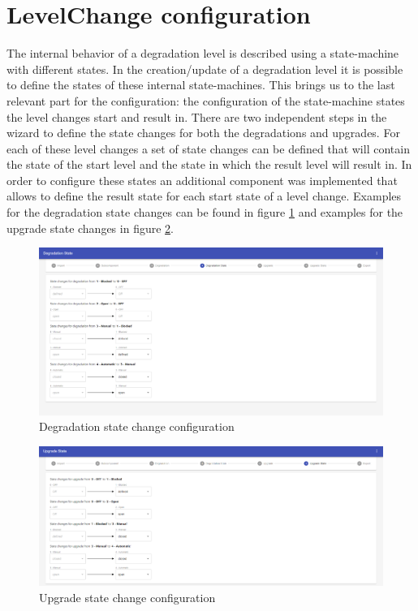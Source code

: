 \section{LevelChange configuration}
The internal behavior of a degradation level is described using a state-machine with different states. In the creation/update of a degradation level it is possible to define the states of these internal state-machines. This brings us to the last relevant part for the configuration: the configuration of the state-machine states the level changes start and result in. There are two independent steps in the wizard to define the state changes for both the degradations and upgrades. For each of these level changes a set of state changes can be defined that will contain the state of the start level and the state in which the result level will result in. In order to configure these states an additional component was implemented that allows to define the result state for each start state of a level change. Examples for the degradation state changes can be found in figure \ref{fig:deg_state_change} and examples for the upgrade state changes in figure \ref{fig:upg:state_change}. 

\begin{figure}[ht]
    \centering
    \includegraphics[width=\textwidth]{img/degradation_level_change_states.png}
    \caption{Degradation state change configuration}
    \label{fig:deg_state_change}
\end{figure}

\begin{figure}[ht]
    \centering
    \includegraphics[width=\textwidth]{img/upgrade_level_change_states.png}
    \caption{Upgrade state change configuration}
    \label{fig:upg:state_change}
\end{figure}

